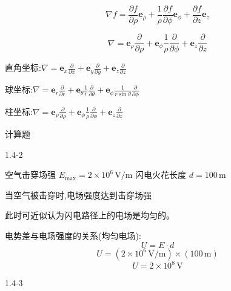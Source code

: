 \documentclass{article}
\begin{document}
$$\nabla f = \frac{\partial f}{\partial \rho} \mathbf{e}_\rho + \frac{1}{\rho} \frac{\partial f}{\partial \phi} \mathbf{e}_\phi + \frac{\partial f}{\partial z} \mathbf{e}_z$$  


$$\nabla = \mathbf{e}_\rho \frac{\partial}{\partial \rho} + \mathbf{e}_\phi \frac{1}{\rho} \frac{\partial}{\partial \phi} + \mathbf{e}_z \frac{\partial}{\partial z}$$  



\vspace{1em}

直角坐标:$\displaystyle \nabla = \mathbf{e}_x \frac{\partial}{\partial x} + \mathbf{e}_y \frac{\partial}{\partial y} + \mathbf{e}_z \frac{\partial}{\partial z}$  

\vspace{1em}

球坐标:$\displaystyle \nabla = \mathbf{e}_r \frac{\partial}{\partial r} + \mathbf{e}_\theta \frac{1}{r} \frac{\partial}{\partial \theta} + \mathbf{e}_\phi \frac{1}{r\sin\theta} \frac{\partial}{\partial \phi}$  

\vspace{1em}

柱坐标:$\displaystyle \nabla = \mathbf{e}_\rho \frac{\partial}{\partial \rho} + \mathbf{e}_\phi \frac{1}{\rho} \frac{\partial}{\partial \phi} + \mathbf{e}_z \frac{\partial}{\partial z}$


\newpage
计算题

1.4-2


空气击穿场强 $ E_{\text{max}} = 2 \times 10^6 \, \text{V/m} $  
闪电火花长度 $ d = 100 \, \text{m} $  
 
当空气被击穿时,电场强度达到击穿场强

此时可近似认为闪电路径上的电场是均匀的。  

电势差与电场强度的关系(均匀电场):  
$$U = E \cdot d$$   
$$U = (2 \times 10^6 \, \text{V/m}) \times (100 \, \text{m})$$  
$$U = 2 \times 10^8 \, \text{V}$$  


\vspace{4em}

1.4-3


\end{document}
